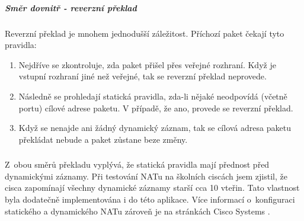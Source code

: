 


\subparagraph{Směr dovnitř - reverzní překlad}

Reverzní překlad je mnohem jednodušší záležitost. Příchozí paket čekají tyto pravidla:
\begin{enumerate}
  \item Nejdříve se zkontroluje, zda paket přišel přes veřejné rozhraní. Když je vstupní rozhraní jiné než veřejné, tak se reverzní překlad neprovede.

  \item Následně se prohledají statická pravidla, zda-li nějaké neodpovídá (včetně portu) cílové adrese paketu. V případě, že ano, provede se reverzní překlad.

  \item Když se nenajde ani žádný dynamický záznam, tak se cílová adresa paketu překládat nebude a paket zůstane beze změny.
\end{enumerate}


\subsubsection*{}
Z~obou směrů překladu vyplývá, že statická pravidla mají přednost před dynamickými záznamy. Při testování NATu na školních ciscách jsem zjistil, že cisca zapomínají všechny dynamické záznamy starší cca 10 vteřin. Tato vlastnost byla dodatečně implementována i do této aplikace. Více informací o~konfiguraci statického a dynamického NATu zároveň je na stránkách Cisco Systems \cite{cisco:snat_dnat}.










